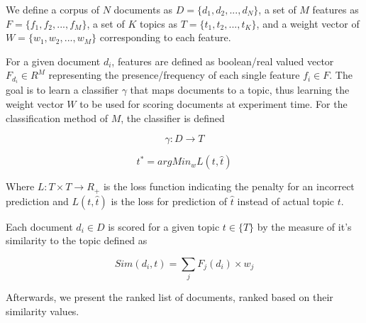 

We define a corpus of $N$ documents as $D = \{{d_{1}}, {d_{2}}, ..., {d_{N}} \}$, a set of $M$ features as $F = \{{f_{1}}, {f_{2}}, ..., {f_{M}} \}$, a set of $K$ topics as $T = \{{t_{1}}, {t_{2}}, ..., {t_{K}} \}$, and a weight vector of $W = \{ {w_{1}}, {w_{2}}, ..., {w_{M}} \}$ corresponding to each feature. 

For a given document ${d_{i}}$, features are defined as boolean/real valued vector ${F_{d_{i}}} \in R^{M}$ representing the presence/frequency of each single feature ${f_{i}} \in F$. The goal is to learn a classifier $\gamma$ that maps documents to a topic, thus learning the weight vector $W$ to be used for scoring documents at experiment time. For the classification method of $M$, the classifier is defined

\begin{equation}
\gamma : D \to T 
\end{equation}

\begin{equation}
t^{*} = argMin_{w} L(t,\hat{t})
\end{equation}

Where ${L : T \times T \to R_{+} }$ is the loss function indicating the penalty for an incorrect prediction and ${L(t,\hat{t})}$ is the loss for prediction of ${\hat{t}}$ instead of actual topic $t$.

Each document ${d_{i}} \in D$ is scored for a given topic ${t \in \{ T \}}$ by the measure of it's similarity to the topic defined as

\begin{equation}
Sim({d_{i}}, t) = \sum_{j} F_{j}(d_{i}) \times {w_{j}}
\end{equation}

Afterwards, we present the ranked list of documents, ranked based on their similarity values.

